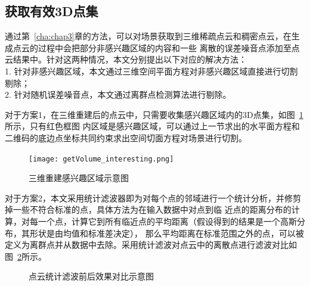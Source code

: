 \subsection{获取有效3D点集}
\label{sec:4.4.1}
通过第~\ref{cha:chap3}章的方法，可以对场景获取到三维稀疏点云和稠密点云，在生成点云的过程中会把部分非感兴趣区域的内容和一些
离散的误差噪音点添加至点云结果中。针对这两种情况，本文分别提出以下对应的解决方法：\\
1.	针对非感兴趣区域，本文通过三维空间平面方程对非感兴趣区域直接进行切割剔除；\\
2.	针对随机误差噪音点，本文通过离群点检测算法进行剔除。

对于方案1，在三维重建后的点云中，只需要收集感兴趣区域内的3D点集，如图~\ref{fig:getVolume_interesting}所示，只有红色框图
内区域是感兴趣区域，可以通过上一节求出的水平面方程和二维码的底边点坐标共同约束求出空间切面方程对场景进行切割。
\begin{figure}[H] %
  \centering
  \texttt{[image: getVolume\_interesting.png]}
  \caption{三维重建感兴趣区域示意图}
  \label{fig:getVolume_interesting}
\end{figure}
对于方案2，本文采用统计滤波器即为对每个点的邻域进行一个统计分析，并修剪掉一些不符合标准的点，具体方法为在输入数据中对点到临
近点的距离分布的计算，对每一个点，计算它到所有临近点的平均距离（假设得到的结果是一个高斯分布，其形状是由均值和标准差决定），
那么平均距离在标准范围之外的点，可以被定义为离群点并从数据中去除。采用统计滤波对点云中的离散点进行滤波对比如
图~\ref{fig:getVolume_3dconstr_filter}所示。
\begin{figure}[H]
  \centering
  \vskip0.5cm
  \caption{点云统计滤波前后效果对比示意图}\label{fig:getVolume_3dconstr_filter}
\end{figure}
